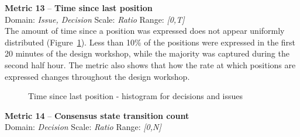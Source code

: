 \documentclass[article]{elsarticle}
\begin{document}
\vspace{1em}
\noindent
\textbf{Metric 13} -- \textbf{Time since last position}\\
Domain: \emph{Issue, Decision} Scale: \emph{Ratio} Range: \emph{[0,T]}\\

The amount of time since a position was expressed does not appear uniformly distributed (Figure~\ref{fig:M13}). Less than 10\% of the positions were expressed in the first 20 minutes of the design workshop, while the majority was captured during the second half hour. The metric also shows that how the rate at which positions are expressed changes throughout the design workshop.
\begin{figure}
  \begin{center}

  \caption{Time since last position - histogram for decisions and issues}
  \label{fig:M13}
  \end{center}
\end{figure}

\vspace{1em}
\noindent
\textbf{Metric 14} -- \textbf{Consensus state transition count}\\
Domain: \emph{Decision} Scale: \emph{Ratio} Range: \emph{[0,N]}\\
\end{document}
